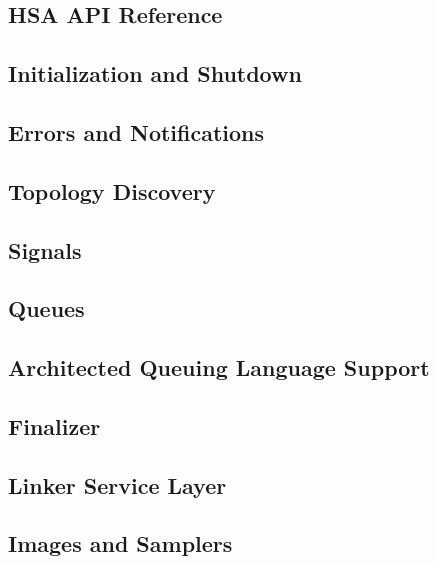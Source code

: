 \documentclass[draft]{book}
\begin{document}
\begin{appendices}

\chapter{HSA API Reference}

\section{Initialization and Shutdown}


\section{Errors and Notifications}


\section{Topology Discovery}


\section{Signals}


\section{Queues}


\section{Architected Queuing Language Support}


\section{Finalizer}


\section{Linker Service Layer}


\section{Images and Samplers}


\end{appendices}
\end{document}
